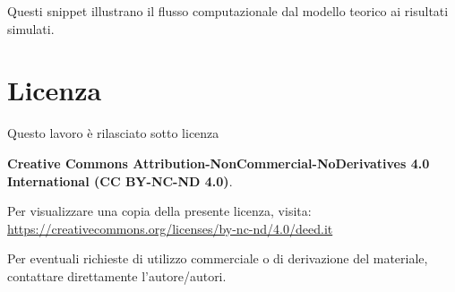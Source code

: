 \documentclass[11pt,a4paper]{article}
\theoremstyle{plain}
\theoremstyle{definition}
\begin{document}
Questi snippet illustrano il flusso computazionale dal modello teorico ai risultati simulati.














\vspace{0.8cm}






\clearpage


\printbibliography



\clearpage


\section{Licenza}

Questo lavoro è rilasciato sotto licenza 

\textbf{Creative Commons Attribution-NonCommercial-NoDerivatives 4.0 International (CC BY-NC-ND 4.0)}.

Per visualizzare una copia della presente licenza, visita:\\
\url{https://creativecommons.org/licenses/by-nc-nd/4.0/deed.it}

Per eventuali richieste di utilizzo commerciale o di derivazione del materiale, contattare direttamente l'autore/autori.
\end{document}

